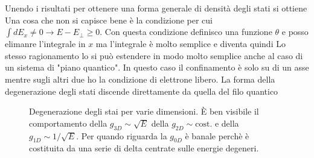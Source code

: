 \documentclass[a4paper,12pt]{article}
\begin{document}
Unendo i risultati per ottenere una forma generale di densità degli stati si ottiene
Una cosa che non si capisce bene è la condizione per cui $\int dE_x \neq 0 \to E-E_\perp\geq0$. Con questa condizione definisco una funzione $\theta$ e posso elimanre l'integrale in $x$
ma l'integrale è molto semplice e diventa quindi
Lo stesso ragionamento lo si può estendere in modo molto semplice anche al caso di un sistema di "piano quantico". In questo caso il confinamento è solo su di un asse mentre sugli altri due ho la condizione di elettrone libero. La forma della degenerazione degli stati discende direttamente da quella del filo quantico
\begin{figure}
	\centering
	\caption{Degenerazione degli stai per varie dimensioni. \`E ben visibile il comportamento della $g_{3D}\sim\sqrt{E}$ della $g_{2D}\sim\text{cost.}$ e della $g_{1D}\sim1/\sqrt{E}$. Per quando riguarda la $g_{0D}$ è banale perchè è costituita da una serie di delta centrate sulle energie degeneri.}
	\label{DEG:ST}
\end{figure}
\end{document}
